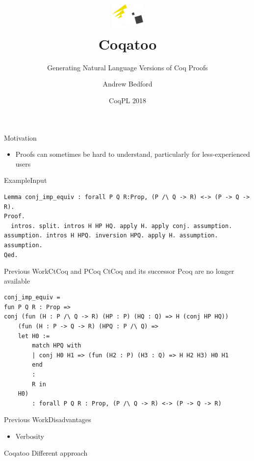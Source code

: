 \documentclass[pdf]{beamer}
\title[Coqatoo]{\includegraphics[width=50pt]{images/logo.png}\\Coqatoo}
\subtitle{Generating Natural Language Versions of Coq Proofs}
\author{Andrew Bedford}
\institute{Laval University}
\date{CoqPL 2018}
\begin{document}
\begin{frame}
    \titlepage
\end{frame}

\begin{frame}{Motivation}
    \begin{itemize}
        \item Proofs can sometimes be hard to understand, particularly for less-experienced users
    \end{itemize}
\end{frame}

\begin{frame}[fragile]{Example}{Input}
\begin{adjustbox}{minipage=\linewidth,bgcolor=coqatoo-gray,trim=-3pt 5pt -3pt 5pt}        
\begin{lstlisting}[label=listing:input]
Lemma conj_imp_equiv : forall P Q R:Prop, (P /\ Q -> R) <-> (P -> Q -> R).
Proof.
  intros. split. intros H HP HQ. apply H. apply conj. assumption. assumption. intros H HPQ. inversion HPQ. apply H. assumption. assumption.
Qed.
\end{lstlisting}
\end{adjustbox}
\end{frame}

\begin{frame}[fragile]{Previous Work}{CtCoq and PCoq}
CtCoq and its successor Pcoq are no longer available
\begin{adjustbox}{minipage=\linewidth,bgcolor=coqatoo-gray,trim=-3pt 5pt -3pt 5pt}            
\begin{lstlisting}
conj_imp_equiv = 
fun P Q R : Prop =>
conj (fun (H : P /\ Q -> R) (HP : P) (HQ : Q) => H (conj HP HQ))
    (fun (H : P -> Q -> R) (HPQ : P /\ Q) =>
    let H0 :=
        match HPQ with
        | conj H0 H1 => (fun (H2 : P) (H3 : Q) => H H2 H3) H0 H1
        end
        :
        R in
    H0)
        : forall P Q R : Prop, (P /\ Q -> R) <-> (P -> Q -> R)
\end{lstlisting}
\end{adjustbox}
\end{frame}

\begin{frame}{Previous Work}{Disadvantages}
\begin{itemize}
    \item Verbosity
\end{itemize}
\end{frame}

\begin{frame}{Coqatoo}
Different approach
\end{frame}
\end{document}
